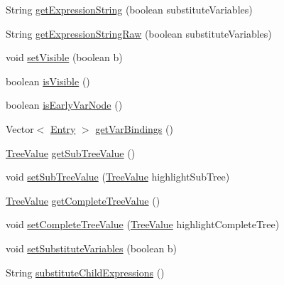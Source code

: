 \begin{DoxyCompactItemize}
String \hyperlink{classorg_1_1tzi_1_1use_1_1uml_1_1ocl_1_1expr_1_1_eval_node_a6775b05f6ec7d98f28080be1e12928d8}{get\-Expression\-String} (boolean substitute\-Variables)
\item 
String \hyperlink{classorg_1_1tzi_1_1use_1_1uml_1_1ocl_1_1expr_1_1_eval_node_ae993df6e167a7fefadd3bfd11f88c6a2}{get\-Expression\-String\-Raw} (boolean substitute\-Variables)
\item 
void \hyperlink{classorg_1_1tzi_1_1use_1_1uml_1_1ocl_1_1expr_1_1_eval_node_a008d1898519f6cbf149d952e4c0491e5}{set\-Visible} (boolean b)
\item 
boolean \hyperlink{classorg_1_1tzi_1_1use_1_1uml_1_1ocl_1_1expr_1_1_eval_node_a340f5efeab71031e04fb4e954edc5fe4}{is\-Visible} ()
\item 
boolean \hyperlink{classorg_1_1tzi_1_1use_1_1uml_1_1ocl_1_1expr_1_1_eval_node_af948692af3483c4d6c7f0a0cf5a73cb8}{is\-Early\-Var\-Node} ()
\item 
Vector$<$ \hyperlink{classorg_1_1tzi_1_1use_1_1uml_1_1ocl_1_1value_1_1_var_bindings_1_1_entry}{Entry} $>$ \hyperlink{classorg_1_1tzi_1_1use_1_1uml_1_1ocl_1_1expr_1_1_eval_node_ab88824740c35662006972d6c8af17c32}{get\-Var\-Bindings} ()
\item 
\hyperlink{enumorg_1_1tzi_1_1use_1_1uml_1_1ocl_1_1expr_1_1_eval_node_1_1_tree_value}{Tree\-Value} \hyperlink{classorg_1_1tzi_1_1use_1_1uml_1_1ocl_1_1expr_1_1_eval_node_a23b5ba95123bf4fc8ff4c36f7cac54cd}{get\-Sub\-Tree\-Value} ()
\item 
void \hyperlink{classorg_1_1tzi_1_1use_1_1uml_1_1ocl_1_1expr_1_1_eval_node_a546bc50e0c1f0907d975bb5aa67d35f5}{set\-Sub\-Tree\-Value} (\hyperlink{enumorg_1_1tzi_1_1use_1_1uml_1_1ocl_1_1expr_1_1_eval_node_1_1_tree_value}{Tree\-Value} highlight\-Sub\-Tree)
\item 
\hyperlink{enumorg_1_1tzi_1_1use_1_1uml_1_1ocl_1_1expr_1_1_eval_node_1_1_tree_value}{Tree\-Value} \hyperlink{classorg_1_1tzi_1_1use_1_1uml_1_1ocl_1_1expr_1_1_eval_node_af470aaa31b267c93e284b8e0ef5251e5}{get\-Complete\-Tree\-Value} ()
\item 
void \hyperlink{classorg_1_1tzi_1_1use_1_1uml_1_1ocl_1_1expr_1_1_eval_node_a05e719625010fbcd3fa6d472bfe595f5}{set\-Complete\-Tree\-Value} (\hyperlink{enumorg_1_1tzi_1_1use_1_1uml_1_1ocl_1_1expr_1_1_eval_node_1_1_tree_value}{Tree\-Value} highlight\-Complete\-Tree)
\item 
void \hyperlink{classorg_1_1tzi_1_1use_1_1uml_1_1ocl_1_1expr_1_1_eval_node_a30634057043277e08df152a6481d5cca}{set\-Substitute\-Variables} (boolean b)
\item 
String \hyperlink{classorg_1_1tzi_1_1use_1_1uml_1_1ocl_1_1expr_1_1_eval_node_a6fac353aad775f7f64b6ed39dc24257c}{substitute\-Child\-Expressions} ()
\end{DoxyCompactItemize}
